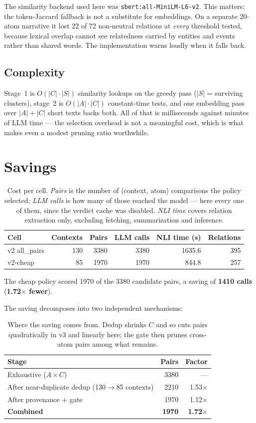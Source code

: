 \documentclass[11pt]{article}
\begin{document}
The similarity backend used here was \texttt{sbert:all-MiniLM-L6-v2}. This matters: the token-Jaccard fallback is not a substitute for embeddings. On a separate 20-atom narrative it lost 22 of 72 non-neutral relations at \emph{every} threshold tested, because lexical overlap cannot see relatedness carried by entities and events rather than shared words. The implementation warns loudly when it falls back.

\subsection{Complexity}
Stage~1 is $O(|C| \cdot |S|)$ similarity lookups on the greedy pass ($|S|$ = surviving clusters), stage~2 is $O(|A| \cdot |C|)$ constant-time tests, and one embedding pass over $|A| + |C|$ short texts backs both. All of that is milliseconds against minutes of LLM time --- the selection overhead is not a meaningful cost, which is what makes even a modest pruning ratio worthwhile.
\section{Savings}
\begin{table}[htbp]
\centering
\begin{tabular}{lrrrrr}
\toprule
Cell & Contexts & Pairs & LLM calls & NLI time (s) & Relations \\
\midrule
v2 all\_pairs & 130 & 3380 & 3380 & 1635.6 & 395 \\
v2-cheap & 85 & 1970 & 1970 & 844.8 & 257 \\
\bottomrule
\end{tabular}
\caption{Cost per cell. \emph{Pairs} is the number of (context, atom) comparisons the policy selected; \emph{LLM calls} is how many of those reached the model --- here every one of them, since the verdict cache was disabled. \emph{NLI time} covers relation extraction only, excluding fetching, summarization and inference.}
\label{tab:cost}
\end{table}
The cheap policy scored 1970 of the 3380 candidate pairs, a saving of \textbf{1410 calls} (\textbf{1.72$\times$ fewer}).

The saving decomposes into two independent mechanisms:
\begin{table}[htbp]
\centering
\begin{tabular}{lrr}
\toprule
Stage & Pairs & Factor \\
\midrule
Exhaustive ($A \times C$) & 3380 & --- \\
After near-duplicate dedup (130$\to$85 contexts) & 2210 & 1.53$\times$ \\
After provenance + gate & 1970 & 1.12$\times$ \\
\midrule
\textbf{Combined} & \textbf{1970} & \textbf{1.72$\times$} \\
\bottomrule
\end{tabular}
\caption{Where the saving comes from. Dedup shrinks $C$ and so cuts pairs quadratically in v3 and linearly here; the gate then prunes cross-atom pairs among what remains.}
\label{tab:decomp}
\end{table}
\end{document}
